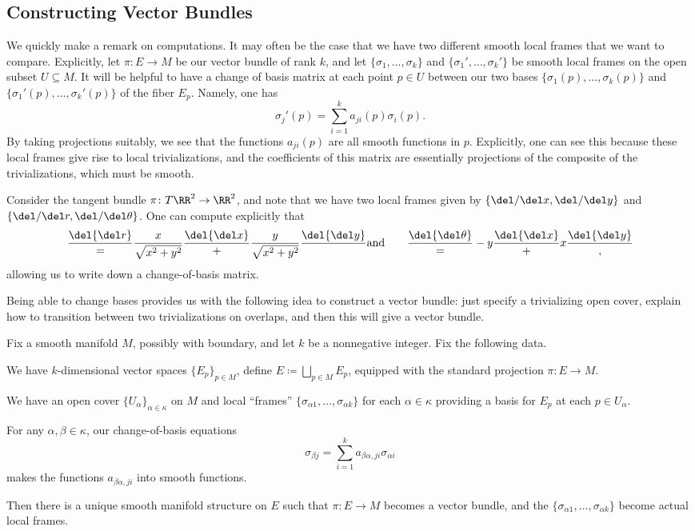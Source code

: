 \documentclass[../notes.tex]{subfiles}
\begin{document}
\subsection{Constructing Vector Bundles}
We quickly make a remark on computations. It may often be the case that we have two different smooth local frames that we want to compare. Explicitly, let $\pi\colon E\to M$ be our vector bundle of rank $k$, and let $\{\sigma_1,\ldots,\sigma_k\}$ and $\{\sigma_1',\ldots,\sigma_k'\}$ be smooth local frames on the open subset $U\subseteq M$. It will be helpful to have a change of basis matrix at each point $p\in U$ between our two bases $\{\sigma_1(p),\ldots,\sigma_k(p)\}$ and $\{\sigma_1'(p),\ldots,\sigma_k'(p)\}$ of the fiber $E_p$. Namely, one has
\[\sigma_j'(p)=\sum_{i=1}^ka_{ji}(p)\sigma_i(p).\]
By taking projections suitably, we see that the functions $a_{ji}(p)$ are all smooth functions in $p$. Explicitly, one can see this because these local frames give rise to local trivializations, and the coefficients of this matrix are essentially projections of the composite of the trivializations, which must be smooth.
\begin{example}
	Consider the tangent bundle $\pi\colon T\RR^2\to\RR^2$, and note that we have two local frames given by $\{\del/\del x,\del/\del y\}$ and $\{\del/\del r,\del/\del\theta\}$. One can compute explicitly that
	\[\frac\del{\del r}=\frac x{\sqrt{x^2+y^2}}\frac\del{\del x}+\frac y{\sqrt{x^2+y^2}}\frac\del{\del y}\qquad\text{and}\qquad\frac\del{\del\theta}=-y\frac\del{\del x}+x\frac\del{\del y},\]
	allowing us to write down a change-of-basis matrix.
\end{example}
Being able to change bases provides us with the following idea to construct a vector bundle: just specify a trivializing open cover, explain how to transition between two trivializations on overlaps, and then this will give a vector bundle.
\begin{lemma} \label{lem:construct-vector-bundle}
	Fix a smooth manifold $M$, possibly with boundary, and let $k$ be a nonnegative integer. Fix the following data.
	\begin{listroman}
		\item We have $k$-dimensional vector spaces $\{E_p\}_{p\in M}$, define $E\coloneqq\bigsqcup_{p\in M}E_p$, equipped with the standard projection $\pi\colon E\to M$.
		\item We have an open cover $\{U_\alpha\}_{\alpha\in\kappa}$ on $M$ and local ``frames'' $\{\sigma_{\alpha1},\ldots,\sigma_{\alpha k}\}$ for each $\alpha\in\kappa$ providing a basis for $E_p$ at each $p\in U_\alpha$.
		\item For any $\alpha,\beta\in\kappa$, our change-of-basis equations
		\[\sigma_{\beta j}=\sum_{i=1}^ka_{\beta\alpha,ji}\sigma_{\alpha i}\]
		makes the functions $a_{\beta\alpha,ji}$ into smooth functions.
	\end{listroman}
	Then there is a unique smooth manifold structure on $E$ such that $\pi\colon E\to M$ becomes a vector bundle, and the $\{\sigma_{\alpha1},\ldots,\sigma_{\alpha k}\}$ become actual local frames.
\end{lemma}
\end{document}
